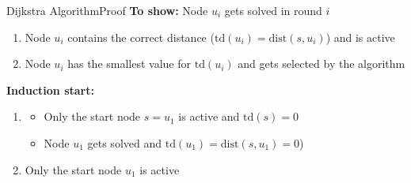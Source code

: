 
\begin{frame}{Dijkstra Algorithm}{Proof}
  \textbf{To show:} Node {\color{Mittel-Blau}$u_i$} gets solved in round
  {\color{Mittel-Blau}$i$}
  \begin{enumerate}
    \item
      Node {\color{Mittel-Blau}$u_i$} contains the correct distance
      ({\color{Mittel-Blau}$\mathrm{td}(u_i) = \mathrm{dist}(s, u_i)$})
      and is active
    \item
      Node {\color{Mittel-Blau}$u_i$} has the smallest value for
      {\color{Mittel-Blau}$\mathrm{td}(u_i)$} and gets selected by the algorithm
  \end{enumerate}
  \vspace{1.0em}
  \textbf{Induction start:}
  \begin{enumerate}
    \item
      \begin{itemize}
        \item
          Only the start node {\color{Mittel-Blau}$s = u_1$} is active and
          {\color{Mittel-Blau}$\mathrm{td}(s) = 0$}
        \item
          Node {\color{Mittel-Blau}$u_1$} gets solved and
          {\color{Mittel-Blau}$\mathrm{td}(u_1) = \mathrm{dist}(s, u_1) = 0$})
      \end{itemize}
    \item
      Only the start node {\color{Mittel-Blau}$u_1$} is active
  \end{enumerate}
\end{frame}


